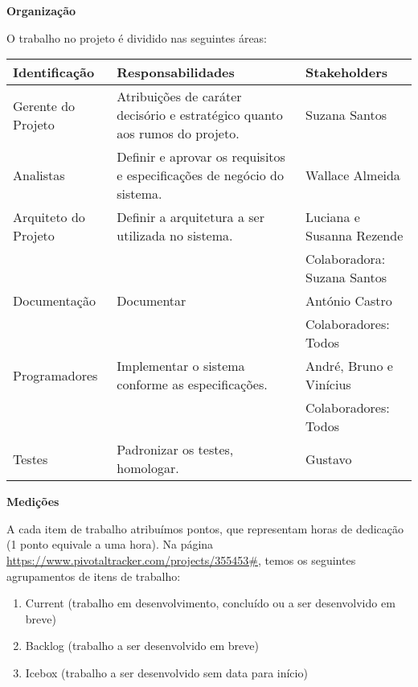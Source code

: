 \documentclass[12pt,letterpaper]{article}
\begin{document}
\vspace{1cm}
{\large {\bf Organização}}
\vspace{0.5cm}

O trabalho no projeto é dividido nas seguintes áreas:


\begin{table}[ht!]
\begin{small} %
    \hspace*{-4mm}
    \begin{tabular}{| l | p{5cm} | p{5cm} |}
    \hline
    Identificação & Responsabilidades & Stakeholders\\
    \hline
    \hline
    Gerente do Projeto &
    Atribuições de caráter decisório e estratégico quanto aos rumos do projeto. &
    Suzana Santos\\
    \hline
    Analistas &
    Definir e aprovar os requisitos e especificações de negócio do sistema. &
    Wallace Almeida\\
    \hline
    Arquiteto do Projeto &
    Definir a arquitetura a ser utilizada no sistema. &
    Luciana e Susanna Rezende \\
    & & Colaboradora: Suzana Santos\\
    \hline
    Documentação &
    Documentar &
    António Castro\\
    & & Colaboradores: Todos\\
    \hline
    Programadores &
    Implementar o sistema conforme as especificações. &
    André, Bruno e Vinícius \\
    & & Colaboradores: Todos\\
    \hline
    Testes &
    Padronizar os testes, homologar. &
    Gustavo\\
    \hline
    \end{tabular}
\end{small}
\end{table}


\vspace{1cm}
{\large {\bf Medições}}
\vspace{0.5cm}

A cada item de trabalho atribuímos pontos, que representam horas de dedicação (1 ponto equivale a uma hora).
Na página \url{https://www.pivotaltracker.com/projects/355453#}, temos os seguintes agrupamentos de itens de trabalho:
\begin{enumerate}
\item{Current (trabalho em desenvolvimento, concluído ou a ser desenvolvido em breve)}
\item{Backlog (trabalho a ser desenvolvido em breve)}
\item{Icebox (trabalho a ser desenvolvido sem data para início)}
\end{enumerate}
\end{document}
